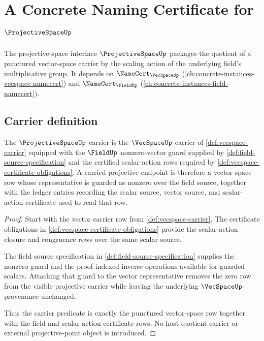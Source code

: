 \chapter{A Concrete Naming Certificate for $\ProjectiveSpaceUp$}
\label{ch:concrete-instances-projectivespace-namecert}

The projective-space interface $\ProjectiveSpaceUp$ packages the quotient of a punctured vector-space carrier by the scaling action of the underlying field's multiplicative group. It depends on $\NameCert_{\VecSpaceUp}$ (\autoref{ch:concrete-instances-vecspace-namecert}) and $\NameCert_{\FieldUp}$ (\autoref{ch:concrete-instances-field-namecert}).

\section{Carrier definition}
\label{sec:projectivespace-carrier}

\begin{theorem}
\label{thm:projectivespace-punctured-carrier-obligation}
The $\ProjectiveSpaceUp$ carrier is the $\VecSpaceUp$ carrier of
\autoref{def:vecspace-carrier} equipped with the $\FieldUp$ nonzero-vector
guard supplied by \autoref{def:field-source-specification} and the certified
scalar-action rows required by \autoref{def:vecspace-certificate-obligations}.
A carried projective endpoint is therefore a vector-space row whose
representative is guarded as nonzero over the field source, together with the
ledger entries recording the scalar source, vector source, and scalar-action
certificate used to read that row.
\end{theorem}
\begin{proof}
Start with the vector carrier row from \autoref{def:vecspace-carrier}. The
certificate obligations in \autoref{def:vecspace-certificate-obligations}
provide the scalar-action closure and congruence rows over the same scalar
source.

The field source specification in \autoref{def:field-source-specification}
supplies the nonzero guard and the proof-indexed inverse operations available
for guarded scalars. Attaching that guard to the vector representative removes
the zero row from the visible projective carrier while leaving the underlying
$\VecSpaceUp$ provenance unchanged.

Thus the carrier predicate is exactly the punctured vector-space row together
with the field and scalar-action certificate rows. No host quotient carrier or
external projective-point object is introduced.
\end{proof}

